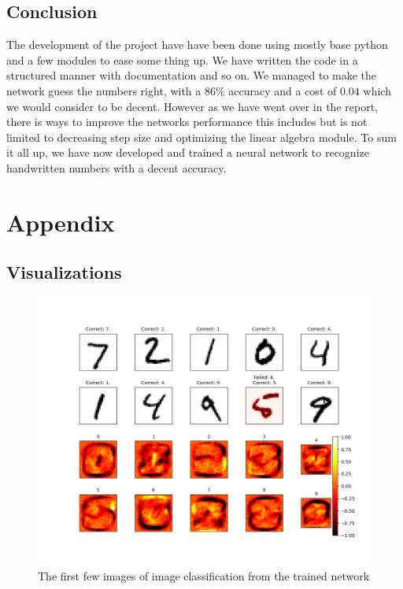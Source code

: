 \documentclass[a4paper,oneside,article,english]{memoir}
\begin{document}
\section{Conclusion}
The development of the project have have been done using mostly base python and a few modules to ease some thing up. 
We have written the code in a structured manner with documentation and so on. We managed to make the network guess 
the numbers right, with a $86\%$ accuracy and a cost of $0.04$ which we would consider to be decent. However as we have 
went over in the report, there is ways to improve the networks performance this includes but is not limited to decreasing 
step size and optimizing the linear algebra module. To sum it all up, we have now developed and trained a neural network 
to recognize handwritten numbers with a decent accuracy.
\newpage
\chapter{Appendix}  
\label{ch:appendix}

\section{Visualizations}
\label{sec:Visualizations}
\begin{figure}[H]
    \centering
    \includegraphics[scale = 0.5]{plot_image_eval.png}
    \caption{The first few images of image classification from the trained network}
    \label{fig:evaluation}
\end{figure}
\end{document}
